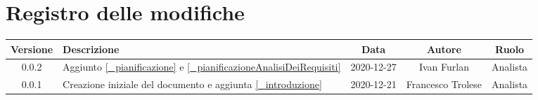 \section*{Registro delle modifiche}

\begin{center}
	\begin{longtable}{|c|p{5cm}|c|c|c|}
	\hline
	\rowcolor{lighter-grayer}
	\textbf{Versione} & \textbf{Descrizione} & \textbf{Data} & \textbf{Autore} & \textbf{Ruolo} \\
	\hline
	\endfirsthead


	\hline
    0.0.2 & Aggiunto \ref{_pianificazione} e \ref{_pianificazioneAnalisiDeiRequisiti} & 2020-12-27 & Ivan Furlan & Analista\\
	\hline
    0.0.1 & Creazione iniziale del documento e aggiunta \ref{_introduzione} & 2020-12-21 & Francesco Trolese & Analista\\
	\hline

	\end{longtable}
\end{center}